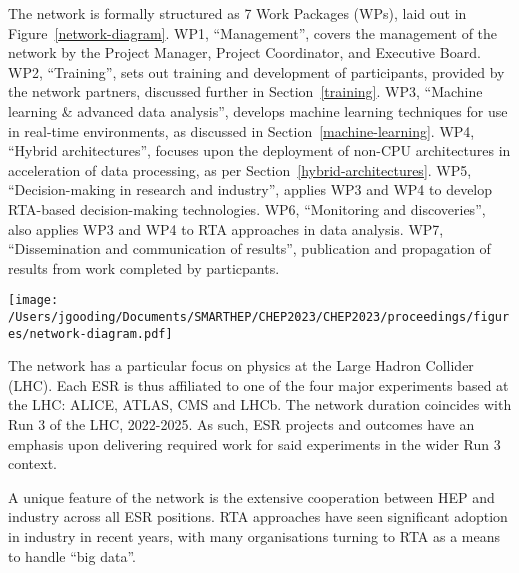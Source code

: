 The network is formally structured as 7 Work Packages (WPs), laid out in Figure~\ref{network-diagram}. WP1, ``Management'', covers the management of the network by the Project Manager, Project Coordinator, and Executive Board. WP2, ``Training'', sets out training and development of participants, provided by the network partners, discussed further in Section~\ref{training}. WP3, ``Machine learning \& advanced data analysis'', develops machine learning techniques for use in real-time environments, as discussed in Section~\ref{machine-learning}. WP4, ``Hybrid architectures'', focuses upon the deployment of non-CPU architectures in acceleration of data processing, as per Section~\ref{hybrid-architectures}. WP5, ``Decision-making in research and industry'', applies WP3 and WP4 to develop RTA-based decision-making technologies. WP6, ``Monitoring and discoveries'', also applies WP3 and WP4 to RTA approaches in data analysis. WP7, ``Dissemination and communication of results'', publication and propagation of results from work completed by particpants.\par
\begin{figure*}[h!]
    \centering
    \texttt{[image: /Users/jgooding/Documents/SMARTHEP/CHEP2023/CHEP2023/proceedings/figures/network-diagram.pdf]}
    \caption{The structure of WPs within the SMARTHEP network. WP1 and WP2 define the organisation of the network; WP3 and WP4 introduce the techniques and tools of real-time analysis to the network; WP5 and WP6 use said techniques and tools to produce results for HEP and industry; WP7 makes these results available and promotes their wider use and adoption.}
    \label{network-diagram}       %
\end{figure*}
The network has a particular focus on physics at the Large Hadron Collider (LHC). Each ESR is thus affiliated to one of the four major experiments based at the LHC: ALICE, ATLAS, CMS and LHCb. The network duration coincides with Run 3 of the LHC, 2022-2025. As such, ESR projects and outcomes have an emphasis upon delivering required work for said experiments in the wider Run 3 context.\par
A unique feature of the network is the extensive cooperation between HEP and industry across all ESR positions. RTA approaches have seen significant adoption in industry in recent years, with many organisations turning to RTA as a means to handle ``big data''.\par
